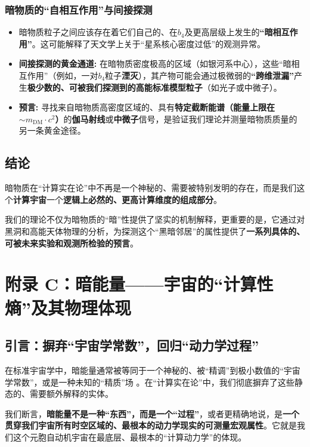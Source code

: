 \documentclass[11pt, a4paper]{article}
\begin{document}
\subsubsection{暗物质的“自相互作用”与间接探测}
\begin{itemize}
    \item 暗物质粒子之间应该存在着它们自己的、在$b_4$及更高层级上发生的\textbf{“暗相互作用”}。这可能解释了天文学上关于“星系核心密度过低”的观测异常。
    \item \textbf{间接探测的黄金通道:} 在暗物质密度极高的区域（如银河系中心），这些“暗相互作用”（例如，一对$b_4$粒子\textbf{湮灭}），其产物可能会通过极微弱的\textbf{“跨维泄漏”}产生\textbf{极少数的、可被我们探测到的高能标准模型粒子}（如光子或中微子）。
    \item \textbf{预言:} 寻找来自暗物质高密度区域的、具有\textbf{特定截断能谱（能量上限在$\sim m_{\text{DM}} \cdot c^2$）}的\textbf{伽马射线}或\textbf{中微子}信号，是验证我们理论并测量暗物质质量的另一条黄金途径。
\end{itemize}

\subsection*{结论}
暗物质在“计算实在论”中不再是一个神秘的、需要被特别发明的存在，而是我们这个\textbf{计算宇宙}一个\textbf{逻辑上必然的、更高计算维度的组成部分}。

我们的理论不仅为暗物质的“暗”性提供了坚实的机制解释，更重要的是，它通过对黑洞和高能天体物理的分析，为探测这个“黑暗邻居”的属性提供了\textbf{一系列具体的、可被未来实验和观测所检验的预言}。



\section{附录 C：暗能量——宇宙的“计算性熵”及其物理体现}

\subsection{引言：摒弃“宇宙学常数”，回归“动力学过程”}
在标准宇宙学中，暗能量通常被等同于一个神秘的、被“精调”到极小数值的“宇宙学常数”，或是一种未知的“精质”场 \cite{Planck2020}。在“计算实在论”中，我们彻底摒弃了这些静态的、需要额外解释的实体。

我们断言，\textbf{暗能量不是一种“东西”，而是一个“过程”}，或者更精确地说，是\textbf{一个贯穿我们宇宙所有时空区域的、最根本的动力学现实的可测量宏观属性}。它就是我们这个元胞自动机宇宙在最底层、最根本的“计算动力学”的体现。
\end{document}
